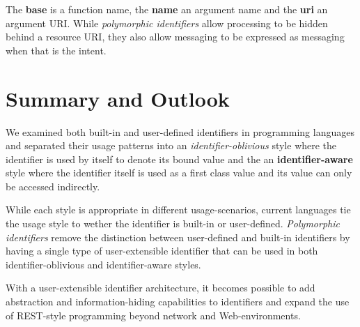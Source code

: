 \documentclass[preprint,authoryear]{acm_proc_article-sp}
\begin{document}
The {\bf base} is a function name, the {\bf name} an argument name and the
{\bf uri} an argument URI.
 While \emph{polymorphic identifiers} allow processing to be
hidden behind a resource URI, they also allow messaging to be expressed
as messaging when that is the intent.


\section{Summary and Outlook}
\label{summary-and-outlook}

We examined both built-in and user-defined identifiers in programming languages 
and separated their usage patterns into an {\em identifier-oblivious} style where
the identifier is used by itself to denote its bound value and the 
an {\bf identifier-aware} style where the identifier itself is used as a first class value
and its value can only be accessed indirectly.

While each style is appropriate in different usage-scenarios, current languages 
tie the usage style to wether the identifier is built-in or user-defined.  \emph{Polymorphic
identifiers} remove the distinction between user-defined and built-in identifiers by having
a single type of user-extensible identifier that can be used in both identifier-oblivious
and identifier-aware styles.

With a user-extensible identifier architecture, it becomes possible to add abstraction
and information-hiding capabilities to identifiers and expand the use of REST-style
programming beyond network and Web-environments.







\break





\balancecolumns
\end{document}
